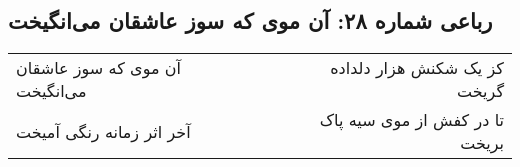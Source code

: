 \begin{center}
\section*{رباعی شماره ۲۸: آن موی که سوز عاشقان می‌انگیخت}
\label{sec:sh028}
\begin{longtable}{l p{0.5cm} r}
آن موی که سوز عاشقان می‌انگیخت
&&
کز یک شکنش هزار دلداده گریخت
\\
آخر اثر زمانه رنگی آمیخت
&&
تا در کفش از موی سیه پاک بریخت
\\
\end{longtable}
\end{center}
